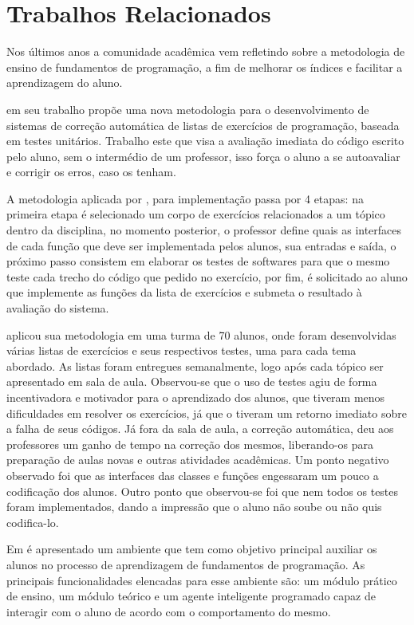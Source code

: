 \documentclass[pnumabnt,normaltoc,espacoumemeio,capchap]{abnt}
\begin{document}
\chapter{Trabalhos Relacionados}
\par Nos últimos anos a comunidade acadêmica vem refletindo sobre a metodologia de ensino de fundamentos de programação, a fim de melhorar os índices e facilitar a aprendizagem do aluno. 
\par {} em seu trabalho propõe uma nova metodologia para o desenvolvimento de sistemas de correção automática de listas de exercícios de programação, baseada em testes unitários. Trabalho este que visa a avaliação imediata do código escrito pelo aluno, sem o intermédio de um professor, isso força o aluno a se autoavaliar e corrigir os erros, caso os tenham. 
\par A metodologia aplicada por , para implementação passa por 4 etapas:  na primeira etapa é selecionado um corpo de exercícios relacionados a um tópico dentro da disciplina, no momento posterior, o professor define quais as interfaces de cada função que deve ser implementada pelos alunos, sua entradas e saída, o próximo passo consistem em elaborar os testes de softwares para que o mesmo teste cada trecho do código que pedido no exercício, por fim, é solicitado ao aluno que implemente as funções da lista de exercícios e submeta o resultado à avaliação do sistema. 
\par {} aplicou sua metodologia em uma turma de 70 alunos, onde foram desenvolvidas várias listas de exercícios e seus respectivos testes, uma para cada tema abordado. As listas foram entregues semanalmente, logo após cada tópico ser apresentado em sala de aula. Observou-se que o uso de testes agiu de forma incentivadora e motivador para o aprendizado dos alunos, que tiveram menos dificuldades em resolver os exercícios, já que o  tiveram um retorno imediato sobre a falha de seus códigos. Já fora da sala de aula, a correção automática, deu aos professores um ganho de tempo na correção dos mesmos, liberando-os para preparação de aulas novas e outras atividades acadêmicas. Um ponto negativo observado foi que as interfaces das classes e funções engessaram um pouco a codificação dos alunos. Outro ponto que observou-se foi que nem todos os testes foram implementados, dando a impressão que o aluno não soube ou não quis codifica-lo.
\par Em  é apresentado um ambiente que tem como objetivo principal auxiliar os alunos no processo de aprendizagem de fundamentos de programação. As principais funcionalidades elencadas para esse ambiente são: um módulo prático de ensino, um módulo teórico e um agente inteligente programado capaz de interagir com o aluno de acordo com o comportamento do mesmo.
\end{document}
